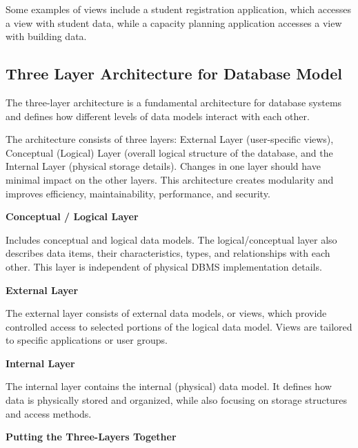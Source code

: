 \documentclass[11pt]{article}
\begin{document}
Some examples of views include a student registration application, which accesses a view with student data, while a capacity planning application accesses a view with building data.


\vspace{11pt}
\subsection{Three Layer Architecture for Database Model}
\vspace{11pt}

The three-layer architecture is a fundamental architecture for database systems and defines how different levels of data models interact with each other.

The architecture consists of three layers: External Layer (user-specific views), Conceptual (Logical) Layer (overall logical structure of the database, and the Internal Layer (physical storage details). Changes in one layer should have minimal impact on the other layers. This architecture creates modularity and improves efficiency, maintainability, performance, and security.

\vspace{11pt}
\textbf{Conceptual / Logical Layer}
\vspace{11pt}

Includes conceptual and logical data models. The logical/conceptual layer also describes data items, their characteristics, types, and relationships with each other. This layer is independent of physical DBMS implementation details.

\vspace{11pt}
\textbf{External Layer}
\vspace{11pt}

The external layer consists of external data models, or views, which provide controlled access to selected portions of the logical data model. Views are tailored to specific applications or user groups.

\vspace{11pt}
\textbf{Internal Layer}
\vspace{11pt}

The internal layer contains the internal (physical) data model. It defines how data is physically stored and organized, while also focusing on storage structures and access methods.

\vspace{11pt}
\textbf{Putting the Three-Layers Together}
\vspace{11pt}
\end{document}
